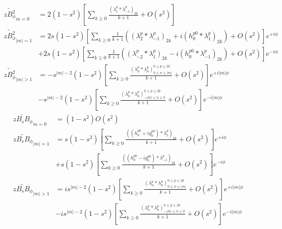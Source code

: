 \begin{equation}
    \begin{aligned}
        \widetilde{zB_\phi^2}_{m=0} &= 2\left(1 - s^2\right) \left[\sum_{k\geq 0} \frac{(\lambda_1^p * \lambda_{-1}^p)_{2k}}{k+1} + O\left(s^2\right)\right] \\ 
        \widetilde{zB_\phi^2}_{|m|=1} &= 2 s \left(1 - s^2\right) \left[\sum_{k\geq 0} \frac{1}{k+1} \left((\lambda_2^p * \lambda_{-1}^p)_{2k} + i (h_0^{p0} * \lambda_{1}^p)_{2k}\right) + O\left(s^2\right)\right] e^{+i\phi} \\ 
        &+ 2 s \left(1 - s^2\right) \left[\sum_{k\geq 0} \frac{1}{k+1} \left((\lambda_{-2}^p * \lambda_{1}^p)_{2k} - i(h_0^{p0} * \lambda_{-1}^p)_{2k}\right) + O\left(s^2\right)\right] e^{-i\phi} \\
        \widetilde{zB_\phi^2}_{|m|>1} &= -s^{|m|-2} \left(1 - s^2\right) \left[\sum_{k\geq 0} \frac{(\lambda_n^p * \lambda_{n}^p)_{0\leq n \leq |m|}^{0\leq p \leq 2k}}{k+1} + O\left(s^2\right)\right] e^{+i|m|\phi} \\ 
        &- s^{|m|-2} \left(1 - s^2\right) \left[\sum_{k\geq 0} \frac{(\lambda_n^p * \lambda_{n}^p)_{-|m|\leq n \leq 0}^{0\leq p \leq 2k}}{k+1} + O\left(s^2\right)\right] e^{-i|m|\phi}
    \end{aligned}
\end{equation}
\begin{equation}
    \begin{aligned}
        \widetilde{zB_s B_\phi}_{m=0} &= \left(1 - s^2\right) O\left(s^2\right) \\ 
        \widetilde{zB_s B_\phi}_{|m|=1} &= s \left(1 - s^2\right) \left[\sum_{k\geq 0} \frac{((h_0^{p0} + ig_0^{p0}) * \lambda_{1}^p)_{2k}}{k+1} + O\left(s^2\right)\right] e^{+i\phi} \\ 
        &+ s \left(1 - s^2\right) \left[\sum_{k\geq 0} \frac{((h_0^{p0} - ig_0^{p0}) * \lambda_{-1}^p)_{2k}}{k+1} + O\left(s^2\right)\right] e^{-i\phi} \\
        \widetilde{zB_s B_\phi}_{|m|>1} &= i s^{|m|-2} \left(1 - s^2\right) \left[\sum_{k\geq 0} \frac{(\lambda_n^p * \lambda_{n}^p)_{0\leq n \leq |m|}^{0\leq p \leq 2k}}{k+1} + O\left(s^2\right)\right] e^{+i|m|\phi} \\ 
        &- is^{|m|-2} \left(1 - s^2\right) \left[\sum_{k\geq 0} \frac{(\lambda_n^p * \lambda_{n}^p)_{-|m|\leq n \leq 0}^{0\leq p \leq 2k}}{k+1} + O\left(s^2\right)\right] e^{-i|m|\phi}
    \end{aligned}
\end{equation}


